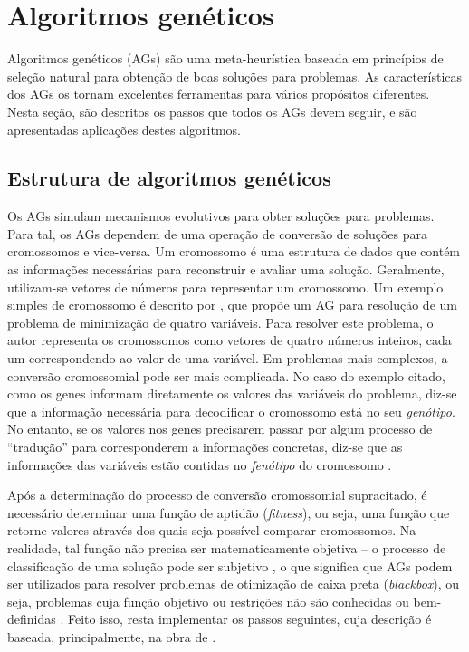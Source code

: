 \section{Algoritmos genéticos}

Algoritmos genéticos (AGs) são uma meta-heurística baseada em princípios de seleção natural para obtenção de boas soluções para problemas. As características dos AGs os tornam excelentes ferramentas para vários propósitos diferentes. Nesta seção, são descritos os passos que todos os AGs devem seguir, e são apresentadas aplicações destes algoritmos.

\subsection{Estrutura de algoritmos genéticos}

Os AGs simulam mecanismos evolutivos para obter soluções para problemas. Para tal, os AGs dependem de uma operação de conversão de soluções para cromossomos e vice-versa. Um cromossomo é uma estrutura de dados que contém as informações necessárias para reconstruir e avaliar uma solução. Geralmente, utilizam-se vetores de números para representar um cromossomo. Um exemplo simples de cromossomo é descrito por \textcite{HERMAWANTO2013}, que propõe um AG para resolução de um problema de minimização de quatro variáveis. Para resolver este problema, o autor representa os cromossomos como vetores de quatro números inteiros, cada um correspondendo ao valor de uma variável. Em problemas mais complexos, a conversão cromossomial pode ser mais complicada. No caso do exemplo citado, como os genes informam diretamente os valores das variáveis do problema, diz-se que a informação necessária para decodificar o cromossomo está no seu \emph{genótipo}. No entanto, se os valores nos genes precisarem passar por algum processo de ``tradução'' para corresponderem a informações concretas, diz-se que as informações das variáveis estão contidas no \emph{fenótipo} do cromossomo \cite{GENDREAU2010}.

Após a determinação do processo de conversão cromossomial supracitado, é necessário determinar uma função de aptidão (\emph{fitness}), ou seja, uma função que retorne valores através dos quais seja possível comparar cromossomos. Na realidade, tal função não precisa ser matematicamente objetiva -- o processo de classificação de uma solução pode ser subjetivo \cite{SASTRY2005}, o que significa que AGs podem ser utilizados para resolver problemas de otimização de caixa preta (\emph{blackbox}), ou seja, problemas cuja função objetivo ou restrições não são conhecidas ou bem-definidas \cite{ALARIE2021}. Feito isso, resta implementar os passos seguintes, cuja descrição é baseada, principalmente, na obra de \textcite{SASTRY2005}.

